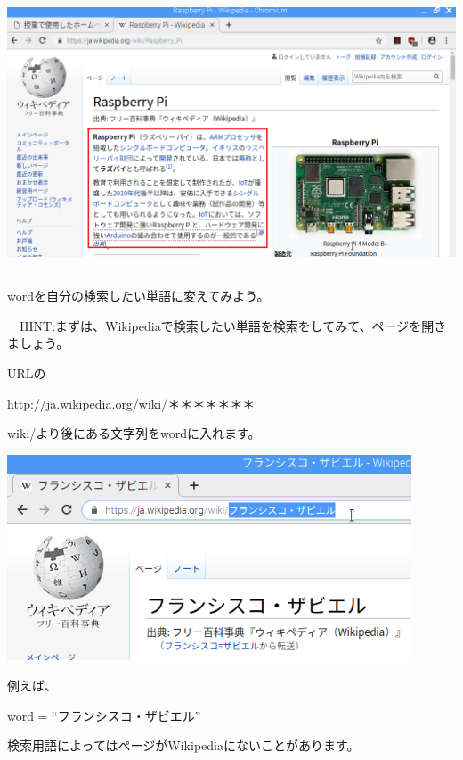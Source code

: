\begin{center}
\includegraphics[width=\textwidth]{./text08-img/textbook-img059.png}

\end{center}

\bigskip

\subsection*{\theQuestion\label{Q:wikipedia}}
wordを自分の検索したい単語に変えてみよう。

\ \ HINT:まずは、Wikipediaで検索したい単語を検索をしてみて、ページを開きましょう。

URLの

http://ja.wikipedia.org/wiki/＊＊＊＊＊＊＊

wiki/より後にある文字列をwordに入れます。



\begin{center}
\includegraphics[width=0.9\textwidth]{./text08-img/textbook-img062.png}

\end{center}
例えば、

word = “フランシスコ・ザビエル”

検索用語によってはページがWikipediaにないことがあります。
